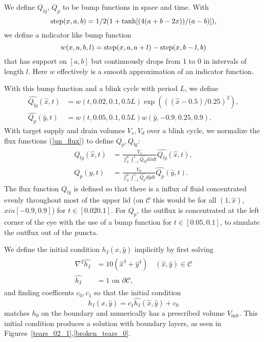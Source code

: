 %
%
\label{sec:flux}

We define $Q_{lg}$, $Q_{p}$ to be bump functions in space and time. With
\begin{equation}
\operatorname{step}(x,a,b) = 1/2 (1 + \tanh[(4 (a + b - 2 x))/(a - b)]),
\end{equation}
we define a indicator like bump function
\begin{equation}
w(x,a,b,l) = \operatorname{step}(x,a,a+l)-\operatorname{step}(x,b-l,b)
\end{equation}
that has support on $[a,b]$ but continuously drops from 1 to 0 in intervals of length $l$. Here $w$ effectively is a smooth approximation of an indicator function. 

 With this bump function and a blink cycle with period $L$, we define
\begin{eqnarray}
\hat{Q_{lg}}(\hat{x},t) &= w(t,0.02,0.1,0.5 L) \exp(((\hat{x}-0.5)/0.25)^2), \label{bumb_funs}  \\
\hat{Q_{p}}(\hat{y},t) &= w(t,0.05,0.1,0.5 L) w(\hat{y},-0.9,0.25,0.9). 
\end{eqnarray}
With target supply and drain volumes $V_s, V_d$ over a blink cycle, we normalize the flux functions (\ref{un_flux}) to define $Q_p,Q_{\lg}$:
\begin{eqnarray}
Q_{lg}(\hat{x},t) &= \frac{V_s}{\int_{0}^{p} \int_{-1}^1 \hat{Q_{lg}} d\hat{x} dt} \hat{Q_{lg}}(\hat{x},t), \\
Q_{p}(\hat{y},t) &= \frac{V_d}{\int_{0}^{p} \int_{-1}^1 \hat{Q_{p}} d\hat{y} dt} \hat{Q_{p}}(\hat{y},t).
\label{un_flux}
\end{eqnarray}
The flux function $Q_{lg}$ is defined so that there is a influx of fluid concentrated evenly throughout most of the upper lid (on $\mathcal{C}$ this would be for all $(1,\hat{x})$, $\hat{x} in [-0.9,0.9]$) for $t \in [0.02 0.1]$. For $Q_{p}$, the outflux is concentrated at the left corner of the eye with the use of a bump function for $t \in [0.05,0.1]$, to simulate the outflux out of the puncta.

We define the initial condition $h_I(\hat{x},\hat{y})$ implicitly by first solving
\begin{align}
\begin{aligned}
\nabla^2 \hat{h_I} &= 10 (\hat{x}^4 +\hat{y}^4) \quad (\hat{x},\hat{y}) \in \mathcal{C} \\
\hat{h_I} &= 1 \mbox{ on } \partial \mathcal{C},
\end{aligned} 
\end{align}
and finding coefficents $c_0,c_1$ so that the initial condition
\begin{equation}
h_I(\hat{x},\hat{y}) = c_1 \hat{h_I}(\hat{x},\hat{y})+c_0
\end{equation}
matches $h_0$ on the boundary and numerically has a prescribed volume $V_{\mbox{init}}$. This initial condition produces a solution with boundary layers, as seen in Figures~\ref{tears_02_1},\ref{broken_tears_0}.